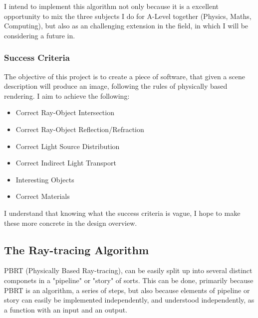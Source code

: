 \documentclass[../main.tex]{subfiles}
\begin{document}
I intend to implement this algorithm not only because it is a excellent opportunity to mix the three subjects I do for A-Level together (Physics, Maths, Computing), but also as an challenging extension in the field, in which I will be considering a future in.
\subsubsection{Success Criteria}
The objective of this project is to create a piece of software, that given a scene description will produce an image, following the rules of physically based rendering. 
I aim to achieve the following:
\begin{itemize}
  \item Correct Ray-Object Intersection
  \item Correct Ray-Object Reflection/Refraction
  \item Correct Light Source Distribution
  \item Correct Indirect Light Transport
  \item Interesting Objects
  \item Correct Materials 
\end{itemize}
I understand that knowing what the success criteria is vague, I hope to make these more concrete in the design overview.
\subsection{The Ray-tracing Algorithm}
PBRT (Physically Based Ray-tracing), can be easily split up into several distinct componets in a "pipeline" or "story" of sorts. This can be done, primarily because PBRT is an algorithm, a series of steps, but also because elements of pipeline or story can easily be implemented independently, and understood independently, as a function with an input and an output.
\end{document}
